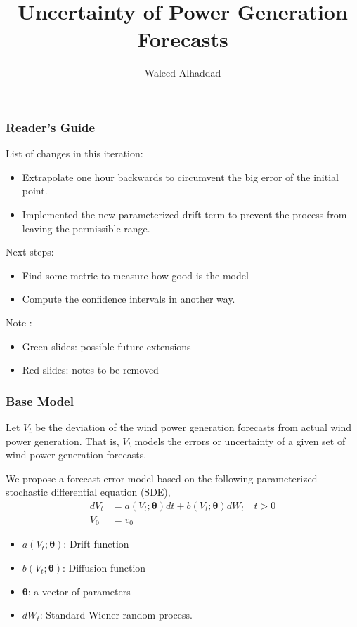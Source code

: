 \documentclass[aspectratio=169]{beamer}\usepackage[utf8]{inputenc}
\title{Uncertainty of Power Generation Forecasts}
\subtitle{ Waleed Alhaddad}
\begin{document}
\begin{frame}
\titlepage
\end{frame}



\begin{frame}[label=guide]\frametitle{ Reader's Guide }

List of changes in this iteration:
\begin{itemize}
\item Extrapolate one hour backwards to circumvent the big error of the initial point.
\item Implemented the new parameterized drift term  to prevent the process from leaving the permissible range.
\end{itemize}

Next steps:
\begin{itemize}
\item Find some metric to measure how good is the model
\item Compute the confidence intervals in another way.
\end{itemize}

Note :
\begin{itemize}
\item Green slides: possible future extensions
\item Red slides: notes to be removed
\end{itemize}

\end{frame}


\begin{frame}\frametitle{ Base Model }
Let $V_t$ be the deviation of the wind power generation forecasts from actual wind power generation. That is, $V_t$ models the errors or uncertainty of a given set of wind power generation forecasts. 

We propose a forecast-error model based on the following parameterized stochastic differential equation (SDE), 
\begin{equation}
\begin{split}
dV_t &= a(V_t; \bm{\theta}) dt + b (V_t; \bm{\theta} ) dW_t \quad t > 0 \\
V_0 & = v_0
\end{split}\label{main}
\end{equation}


\begin{itemize}
\item $a(V_t; \bm{\theta})$: Drift function 
\item $b (V_t; \bm{\theta} )$: Diffusion function 
\item $\bm{\theta}$: a vector of parameters
\item $dW_t$: Standard Wiener random process.
\end{itemize}
\end{frame}
\end{document}
